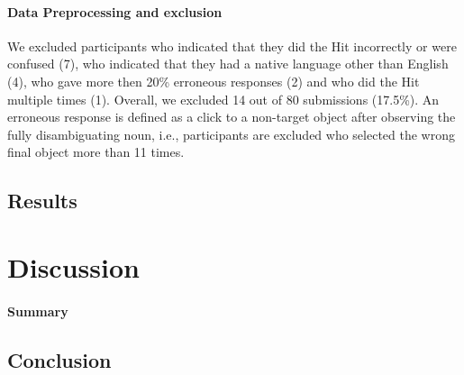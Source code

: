 \documentclass[a4paper,man,floatsintext,natbib,donotrepeattitle]{apa6}
\begin{document}
\paragraph{Data Preprocessing and exclusion}

We excluded participants who indicated that they did the Hit incorrectly or were confused (7), who indicated that they had a native language other than English (4), who gave more then 20\% erroneous responses (2) and who did the Hit multiple times (1). Overall, we excluded 14 out of 80 submissions (17.5\%). An erroneous response is defined as a click to a non-target object after observing the fully disambiguating noun, i.e., participants are excluded who selected the wrong final object more than 11 times.

\subsection{Results}

\section{Discussion}

\paragraph{Summary}

\subsection{Conclusion}

\end{document}
